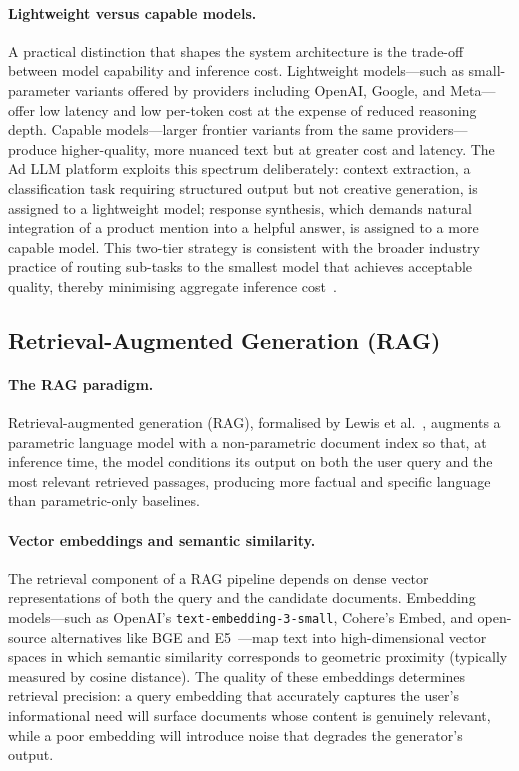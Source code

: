\paragraph{Lightweight versus capable models.}
A practical distinction that shapes the system architecture is the
trade-off between model capability and inference cost. Lightweight
models---such as small-parameter variants offered by providers
including OpenAI, Google, and Meta---offer low latency and low
per-token cost at the expense of reduced reasoning depth. Capable
models---larger frontier variants from the same providers---produce
higher-quality, more nuanced text but at greater cost and latency.
The Ad LLM platform exploits this spectrum deliberately: context
extraction, a classification task requiring structured output but not
creative generation, is assigned to a lightweight model; response
synthesis, which demands natural integration of a product mention
into a helpful answer, is assigned to a more capable
model. This two-tier strategy is consistent with the broader industry
practice of routing sub-tasks to the smallest model that achieves
acceptable quality, thereby minimising aggregate inference
cost~\cite{chen2023frugalgpt}.

\subsection{Retrieval-Augmented Generation (RAG)}
\label{subsec:rag}

\paragraph{The RAG paradigm.}
Retrieval-augmented generation (RAG), formalised by Lewis et al.~\cite{lewis2020rag}, augments a parametric language model with a non-parametric document index so that, at inference time, the model conditions its output on both the user query and the most relevant retrieved passages, producing more factual and specific language than parametric-only baselines.

\paragraph{Vector embeddings and semantic similarity.}
The retrieval component of a RAG pipeline depends on dense vector
representations of both the query and the candidate documents.
Embedding models---such as OpenAI's \texttt{text-embedding-3-small},
Cohere's Embed, and open-source alternatives like BGE and
E5~\cite{wang2022e5, xiao2023bge}---map text into high-dimensional
vector spaces in which semantic similarity corresponds to geometric
proximity (typically measured by cosine distance). The quality of
these embeddings determines retrieval precision: a query embedding
that accurately captures the user's informational need will surface
documents whose content is genuinely relevant, while a poor embedding
will introduce noise that degrades the generator's output.

